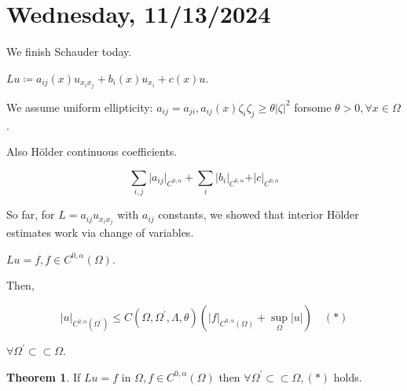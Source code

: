 \documentclass{article}
\theoremstyle{definition}
\newtheorem{theorem}{Theorem}
\begin{document}
\section*{Wednesday, 11/13/2024}

We finish Schauder today.

\(Lu \coloneqq a_{ij} (x) u_{x_i x_j} + b_i(x)u_{x_i} + c(x) u\).

We assume uniform ellipticity: \(a_{ij} = a_{ji}, a_{ij} (x) \zeta_i \zeta_j \geq \theta \vert \zeta \vert ^2\) forsome \(\theta > 0,\forall x\in \Omega\).

Also H\"older continuous coefficients.

\[
   \sum_{i,j} \vert a_{ij} \vert_{C^{0,\alpha}} + \sum_{i} \vert b_i \vert_{C^{0,\alpha}} + \vert c \vert_{C^{0,\alpha}}
\]

So far, for \(L = a_{ij} u_{x_i x_j}\) with \(a_{ij}\) constants, we showed that interior H\"older estimates work via change of variables. 

\(Lu = f, f \in C^{0,\alpha}(\Omega)\).

Then,

\[
    \vert u \vert_{C^{2,\alpha}(\Omega^{\prime})} \leq C(\Omega , \Omega ^{\prime} , \Lambda , \theta) (\vert f \vert_{C^{0,\alpha}(\Omega)} + \sup_\Omega \vert u \vert ) \quad (\ast)
\]

\(\forall \Omega ^{\prime} \subset \subset \Omega\).

\begin{theorem}
    If \(Lu = f\) in \(\Omega , f\in C^{0,\alpha}(\Omega)\) then \(\forall \Omega ^{\prime} \subset \subset \Omega, (\ast)\) holds.
\end{theorem}
\end{document}
